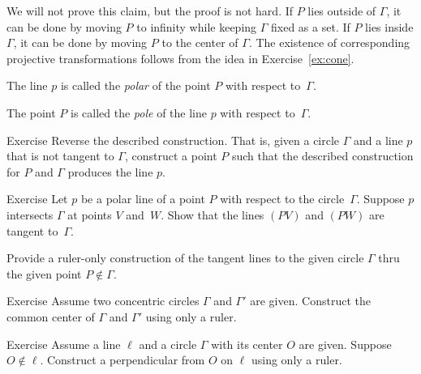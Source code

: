 We will not prove this claim, but the proof is not hard.
If $P$ lies outside of $\Gamma$, it can be done by moving $P$ to infinity while keeping $\Gamma$ fixed as a set.
If $P$ lies inside $\Gamma$, it can be done by moving $P$ to the center of $\Gamma$.
The existence of corresponding projective transformations follows from the idea in Exercise~\ref{ex:cone}.

The line $p$ is called the \emph{polar} of the point $P$ with respect to~$\Gamma$.

The point $P$ is called the \emph{pole} of the line $p$ with respect to~$\Gamma$.

\begin{thm}{Exercise}\label{ex:revert}
Reverse the described construction.
That is, given a circle $\Gamma$ and a line $p$ that is not tangent to $\Gamma$, construct a point $P$ such that the described construction for $P$ and $\Gamma$ produces the line $p$.
\end{thm}

\begin{thm}{Exercise}\label{ex:tangent ruler}
Let $p$ be a polar line of a point $P$ with respect to the circle~$\Gamma$.
Suppose $p$ intersects $\Gamma$ at points $V$ and~$W$.
Show that the lines $(PV)$ and $(PW)$ are tangent to~$\Gamma$.

Provide a ruler-only construction of the tangent lines to the given circle $\Gamma$ thru the given point $P\notin\Gamma$.
\end{thm}

\begin{thm}{Exercise}\label{ex:concentric-circ}
Assume two concentric circles $\Gamma$ and $\Gamma'$ are given.
Construct the common center of $\Gamma$ and $\Gamma'$ using only a ruler.
\end{thm}

\begin{thm}{Exercise}\label{ex:proj-perp}
Assume a line $\ell$ and a circle $\Gamma$ with its center $O$ are given.
Suppose $O\notin \ell$.
Construct a perpendicular from $O$ on $\ell$ using only a ruler.
\end{thm}

